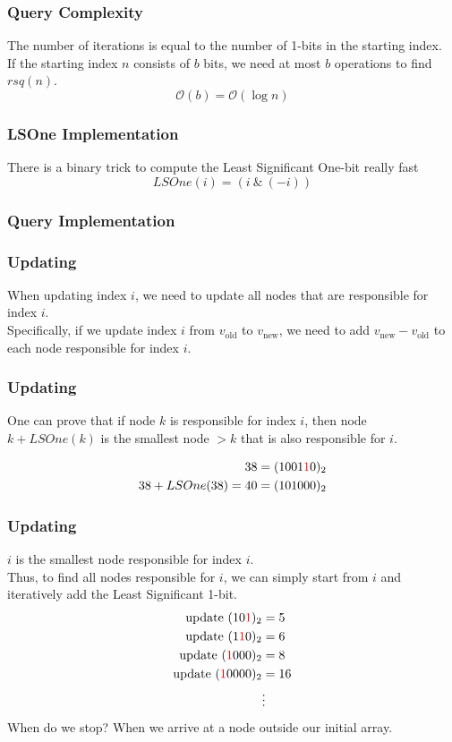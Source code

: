 \documentclass[12pt]{beamer}
\newcommand{\bigoh}[1]{\ensuremath{\mathcal{O}\left(#1\right)}}
\newcommand{\blank}{\vspace{.5cm}}
\begin{document}
\begin{frame}
    \frametitle{Query Complexity}
    The number of iterations is equal to the number of 1-bits in the starting
    index. \\\blank
    If the starting index $n$ consists of $b$ bits, we need at most $b$
    operations to find $rsq(n)$.
    \[ \bigoh{b} = \bigoh{\log n} \]
\end{frame}

\begin{frame}
    \frametitle{LSOne Implementation}
    There is a binary trick to compute the Least Significant One-bit
    really fast
    \[ LSOne(i) = (i\ \&\ (-i)) \]
\end{frame}

\begin{frame}
    \frametitle{Query Implementation}
    
\end{frame}

\begin{frame}
    \frametitle{Updating}
    When updating index $i$, we need to update all nodes that are responsible
    for index $i$. \\\blank
    Specifically, if we update index $i$ from $v_\mathrm{old}$ to 
    $v_\mathrm{new}$, we need to add 
    $v_\mathrm{new} - v_\mathrm{old}$ to each node responsible for index $i$.
\end{frame}

\begin{frame}
    \frametitle{Updating}
    One can prove that if node $k$ is responsible for index $i$, then
    node $k + LSOne(k)$ is the smallest node $>k$ that is also responsible
    for $i$.

    \begin{align*}
        38 &= (1001\textcolor{red}{1}0)_2 \\
        38 + LSOne(38) = 40 &= (101000)_2
    \end{align*}
\end{frame}

\begin{frame}
    \frametitle{Updating}
    $i$ is the smallest node responsible for index $i$. \\\blank
    Thus, to find all nodes responsible for $i$, we can simply start from $i$
    and iteratively add the Least Significant 1-bit. \\\blank
    \begin{align*}
        \text{update } (10\textcolor{red}{1})_2 &= 5 \\
        \text{update } (1\textcolor{red}{1}0)_2 &= 6 \\
        \text{update } (\textcolor{red}{1}000)_2 &= 8 \\
        \text{update } (\textcolor{red}{1}0000)_2 &= 16 \\
        &\vdots
    \end{align*}
    When do we stop? When we arrive at a node outside our initial array.
\end{frame}
\end{document}
